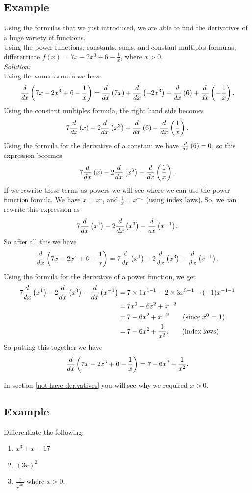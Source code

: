 \subsection{Example}
Using the formulas that we just introduced, we are able to find the derivatives of a huge variety of functions.  \\

\noindent Using the power functions, constants, sums, and constant multiples formulas, differentiate $f(x) = 7x - 2x^3 + 6 - \frac{1}{x}$, where $x > 0$. \\

\noindent \textit{Solution:} \\
Using the sums formula we have
\[
\frac{d}{dx}\left(7x - 2x^3 + 6 - \frac{1}{x}\right) = \frac{d}{dx}\left(7x\right) + \frac{d}{dx}\left(-2x^3\right) + \frac{d}{dx}\left(6\right) + \frac{d}{dx}\left(-\frac{1}{x}\right). 
\]
Using the constant multiples formula, the right hand side becomes
\[
7\frac{d}{dx}\left(x\right) - 2\frac{d}{dx}\left(x^3\right) + \frac{d}{dx}\left(6\right) - \frac{d}{dx}\left(\frac{1}{x}\right).
\]
Using the formula for the derivative of a constant we have $\frac{d}{dx}\left(6\right) = 0$, so this expression becomes
\[
7\frac{d}{dx}\left(x\right) - 2\frac{d}{dx}\left(x^3\right) - \frac{d}{dx}\left(\frac{1}{x}\right).
\]
If we rewrite these terms as powers we will see where we can use the power function fomula. We have $x = x^1$, and $\frac{1}{x} = x^{-1}$ (using index laws). So, we can rewrite this expression as
\[
7\frac{d}{dx}\left(x^1\right) - 2\frac{d}{dx}\left(x^3\right) - \frac{d}{dx}\left(x^{-1}\right).
\]
So after all this we have
\[
\frac{d}{dx}\left(7x - 2x^3 + 6 - \frac{1}{x}\right) = 7\frac{d}{dx}\left(x^1\right) - 2\frac{d}{dx}\left(x^3\right) - \frac{d}{dx}\left(x^{-1}\right).
\]
Using the formula for the derivative of a power function, we get
\begin{align*}
7\frac{d}{dx}\left(x^1\right) - 2\frac{d}{dx}\left(x^3\right) - \frac{d}{dx}\left(x^{-1}\right) & = 7\times1x^{1-1} - 2\times3x^{3-1} - (-1)x^{-1-1} \\
	& = 7x^0 - 6x^2 +x^{-2} \\
	& = 7 - 6x^2 + x^{-2} \tag{since $x^0 = 1$} \\
	& = 7 - 6x^2 + \frac{1}{x^2}. \tag{index laws}
\end{align*}
So putting this together we have
\[
\frac{d}{dx}\left(7x - 2x^3 + 6 - \frac{1}{x}\right) = 7 - 6x^2 + \frac{1}{x^2}.
\]

In section \ref{not have derivatives} you will see why we required $x > 0$.

\subsection{Example}
Differentiate the following:
\begin{enumerate}
\item $x^3 + x - 17$
\item $(3x)^2$
\item $\frac{1}{\sqrt{x}}$ where $x > 0$. 
\end{enumerate}
\bigskip

